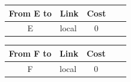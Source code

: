\begin{enumerate}
\begin{enumerate}
\begin{table}[H]
\begin{tabular}{@{}clcll@{}}
                \toprule
                From E to            & \multicolumn{1}{c}{Link} & Cost                 \\ \midrule
                E                    & local                    & 0                    \\ \bottomrule
            \end{tabular}
            \hfill
            \begin{tabular}{@{}clcll@{}}
                \toprule
                From F to            & \multicolumn{1}{c}{Link} & Cost                 \\ \midrule
                F                    & local                    & 0                    \\ \bottomrule
            \end{tabular}
        \end{table}


\end{enumerate}
\end{enumerate}
